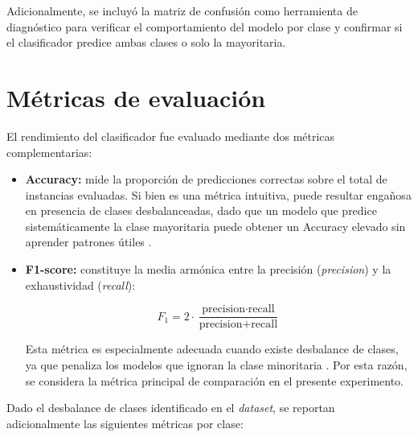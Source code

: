 Adicionalmente, se incluyó la matriz de confusión como herramienta de
diagnóstico para verificar el comportamiento del modelo por clase y
confirmar si el clasificador predice ambas clases o solo la mayoritaria.

\section{Métricas de evaluación}

El rendimiento del clasificador fue evaluado mediante dos métricas
complementarias:

\begin{itemize}
    \item \textbf{Accuracy:} mide la proporción de predicciones correctas
          sobre el total de instancias evaluadas. Si bien es una métrica
          intuitiva, puede resultar engañosa en presencia de clases
          desbalanceadas, dado que un modelo que predice sistemáticamente
          la clase mayoritaria puede obtener un Accuracy elevado sin
          aprender patrones útiles \parencite{japkowicz2002}.

    \item \textbf{F1-score:} constituye la media armónica entre la
          precisión (\textit{precision}) y la exhaustividad
          (\textit{recall}):

          \[
          F_1 = 2 \cdot \frac{\text{precision} \cdot \text{recall}}
          {\text{precision} + \text{recall}}
          \]

          Esta métrica es especialmente adecuada cuando existe desbalance
          de clases, ya que penaliza los modelos que ignoran la clase
          minoritaria \parencite{japkowicz2002}. Por esta razón, se
          considera la métrica principal de comparación en el presente
          experimento.
\end{itemize}

Dado el desbalance de clases identificado en el \textit{dataset}, se reportan
adicionalmente las siguientes métricas por clase:

